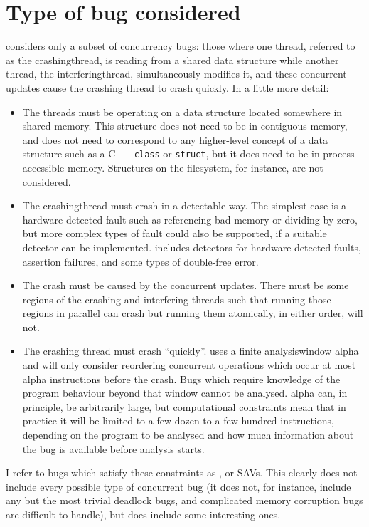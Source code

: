 \section{Type of bug considered}
\label{sect:types_of_bugs}

{\Technique} considers only a subset of concurrency bugs: those where
one thread, referred to as the \gls{crashingthread}, is reading from a
shared data structure while another thread, the
\gls{interferingthread}, simultaneously modifies it, and these
concurrent updates cause the crashing thread to crash quickly.  In a
little more detail:
\begin{itemize}
\item The threads must be operating on a data structure located
  somewhere in shared memory.  This structure does not need to be in
  contiguous memory, and does not need to correspond to any
  higher-level concept of a data structure such as a C++
  \texttt{class} or \texttt{struct}, but it does need to be in
  process-accessible memory.  Structures on the filesystem, for
  instance, are not considered.
\item The \gls{crashingthread} must crash in a detectable way.  The
  simplest case is a hardware-detected fault such as referencing bad
  memory or dividing by zero, but more complex types of fault could
  also be supported, if a suitable detector can be implemented.
  {\Implementation} includes detectors for hardware-detected faults,
  assertion failures, and some types of double-free error.
\item The crash must be caused by the concurrent updates.  There must
  be some regions of the crashing and interfering threads such that
  running those regions in parallel can crash but running them
  atomically, in either order, will not.
\item The crashing thread must crash ``quickly''.  {\Technique} uses a
  finite \gls{analysiswindow} \gls{alpha} and will only consider
  reordering concurrent operations which occur at most \gls{alpha}
  instructions before the crash.  Bugs which require knowledge of the
  program behaviour beyond that window cannot be analysed.
  \gls{alpha} can, in principle, be arbitrarily large, but
  computational constraints mean that in practice it will be limited
  to a few dozen to a few hundred instructions, depending on the
  program to be analysed and how much information about the bug is
  available before analysis starts.
\end{itemize}
I refer to bugs which satisfy these constraints as , or SAVs.  This
clearly does not include every possible type of concurrent bug (it
does not, for instance, include any but the most trivial deadlock
bugs, and complicated memory corruption bugs are difficult to handle),
but does include some interesting ones.

